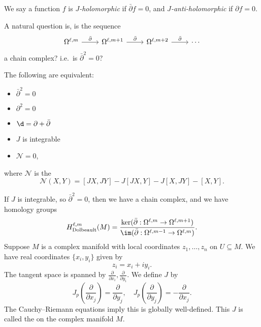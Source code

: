\documentclass[a4paper]{article}
\newcommand\Dolb{\mathrm{Dolbeault}}
\begin{document}
\begin{defi}[$J$-holomorphic]
  We say a function $f$ is \emph{$J$-holomorphic} if $\bar{\partial} f = 0$, and \emph{$J$-anti-holomorphic} if $\partial f = 0$.
\end{defi}

A natural question is, is the sequence
\[
  \begin{tikzcd}
    \Omega^{\ell, m} \ar[r, "\bar{\partial}"] &
    \Omega^{\ell, m + 1} \ar[r, "\bar{\partial}"] &
    \Omega^{\ell, m + 2} \ar[r, "\bar{\partial}"] &
    \cdots
  \end{tikzcd}
\]
a chain complex? i.e.\ is $\bar{\partial}^2 = 0$?
\begin{thm}
  The following are equivalent:
  \begin{itemize}
    \item $\bar{\partial}^2 = 0$
    \item $\partial^2 = 0$
    \item $\d = \partial + \bar{\partial}$
    \item $J$ is integrable
    \item $\mathcal{N} = 0$,
  \end{itemize}
  where $\mathcal{N}$ is the 
  \[
    \mathcal{N}(X, Y) = [JX, JY] - J[JX, Y] - J[X, JY] - [X, Y].
  \]
\end{thm}
If $J$ is integrable, so $\bar{\partial}^2 = 0$, then we have a chain complex, and we have homology groups
\[
  H^{\ell, m}_{\Dolb} (M) = \frac{\ker(\bar{\partial}: \Omega^{\ell, m} \to \Omega^{\ell, m + 1})}{\im (\bar{\partial}: \Omega^{\ell, m - 1} \to \Omega^{\ell, m})}.
\]
Suppose $M$ is a complex manifold with local coordinates $z_1, \ldots, z_n$ on $U \subseteq M$. We have real coordinates $\{x_i, y_i\}$ given by
\[
  z_i = x_i + i y_i.
\]
The tangent space is spanned by $\frac{\partial}{\partial x_i}, \frac{\partial }{\partial y_i}$. We define $J$ by
\[
  J_p\left(\frac{\partial}{\partial x_j}\right) = \frac{\partial}{\partial y_j},\quad J_p\left(\frac{\partial}{\partial y_j}\right) = - \frac{\partial}{\partial x_j}.
\]
The Cauchy--Riemann equations imply this is globally well-defined. This $J$ is called the  on the complex manifold $M$.
\end{document}
